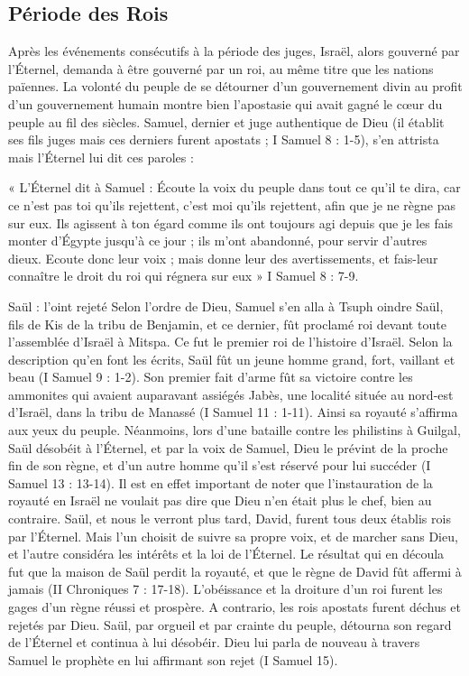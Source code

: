 \subsection*{Période des Rois}

Après les événements consécutifs à la période des juges, Israël, alors gouverné par l’Éternel, demanda à être gouverné par un roi, au même titre que les nations païennes. La volonté du peuple de se détourner d'un gouvernement divin au profit d'un gouvernement humain montre bien l'apostasie qui avait gagné le cœur du peuple au fil des siècles. Samuel, dernier et juge authentique de Dieu (il établit ses fils juges mais ces derniers furent apostats ; I Samuel 8 : 1-5), s'en attrista mais l’Éternel lui dit ces paroles :

« L’Éternel dit à Samuel : Écoute la voix du peuple dans tout ce qu'il te dira, car ce n'est pas toi qu'ils rejettent, c'est moi qu'ils rejettent, afin que je ne règne pas sur eux. Ils agissent à ton égard comme ils ont toujours agi depuis que je les fais monter d’Égypte jusqu'à ce jour ; ils m'ont abandonné, pour servir d'autres dieux. Ecoute donc leur voix ; mais donne leur des avertissements, et fais-leur connaître le droit du roi qui régnera sur eux » I Samuel 8 : 7-9.

Saül : l'oint rejeté
Selon l'ordre de Dieu, Samuel s'en alla à Tsuph oindre Saül, fils de Kis de la tribu de Benjamin, et ce dernier, fût proclamé roi devant toute l'assemblée d'Israël à Mitspa. Ce fut le premier roi de l'histoire d'Israël. Selon la description qu'en font les écrits, Saül fût un jeune homme grand, fort, vaillant et beau (I Samuel 9 : 1-2).
Son premier fait d'arme fût sa victoire contre les ammonites qui avaient auparavant assiégés Jabès, une localité située au nord-est d'Israël, dans la tribu de Manassé (I Samuel 11 : 1-11). Ainsi sa royauté s'affirma aux yeux du peuple.
Néanmoins, lors d'une bataille contre les philistins à Guilgal, Saül désobéit à l’Éternel, et par la voix de Samuel, Dieu le prévint de la proche fin de son règne, et d'un autre homme qu'il s'est réservé pour lui succéder (I Samuel 13 : 13-14).
Il est en effet important de noter que l'instauration de la royauté en Israël ne voulait pas dire que Dieu n'en était plus le chef, bien au contraire. Saül, et nous le verront plus tard, David, furent tous deux établis rois par l’Éternel. Mais l'un choisit de suivre sa propre voix, et de marcher sans Dieu, et l'autre considéra les intérêts et la loi de l’Éternel. Le résultat qui en découla fut que la maison de Saül perdit la royauté, et que le règne de David fût affermi à jamais (II Chroniques 7 : 17-18). L'obéissance et la droiture d'un roi furent les gages d'un règne réussi et prospère. A contrario, les rois apostats furent déchus et rejetés par Dieu.
Saül, par orgueil et par crainte du peuple, détourna son regard de l’Éternel et continua à lui désobéir. Dieu lui parla de nouveau à travers Samuel le prophète en lui affirmant son rejet (I Samuel 15).

